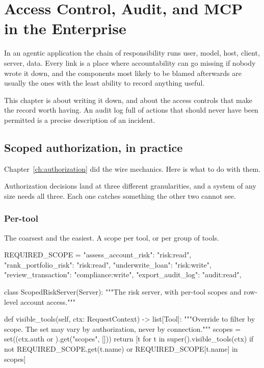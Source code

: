 \chapter{Access Control, Audit, and MCP in the Enterprise}
\label{ch:access-control}

In an agentic application the chain of responsibility runs user, model, host,
client, server, data. Every link is a place where accountability can go missing
if nobody wrote it down, and the components most likely to be blamed afterwards
are usually the ones with the least ability to record anything useful.

This chapter is about writing it down, and about the access controls that make
the record worth having. An audit log full of actions that should never have
been permitted is a precise description of an incident.

\section{Scoped authorization, in practice}

Chapter~\ref{ch:authorization} did the wire mechanics. Here is what to do with
them.

Authorization decisions land at three different granularities, and a system of
any size needs all three. Each one catches something the other two cannot see.

\subsection{Per-tool}

The coarsest and the easiest. A scope per tool, or per group of tools.

\begin{py}
REQUIRED_SCOPE = {
    "assess_account_risk": "risk:read",
    "rank_portfolio_risk": "risk:read",
    "underwrite_loan":     "risk:write",
    "review_transaction":  "compliance:write",
    "export_audit_log":    "audit:read",
}

class ScopedRiskServer(Server):
    """The risk server, with per-tool scopes and row-level account access."""

    def visible_tools(self, ctx: RequestContext) -> list[Tool]:
        """Override to filter by scope. The set may vary by authorization,
        never by connection."""
        scopes = set((ctx.auth or {}).get("scopes", []))
        return [t for t in super().visible_tools(ctx)
                if not REQUIRED_SCOPE.get(t.name)
                or REQUIRED_SCOPE[t.name] in scopes]
\end{py}

